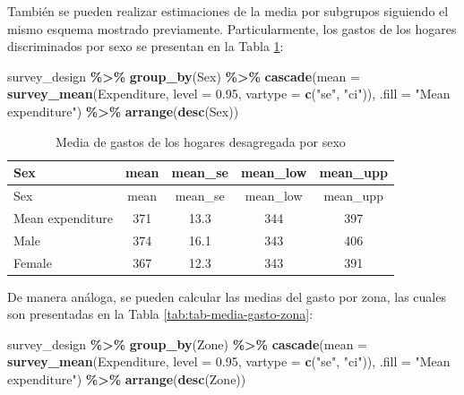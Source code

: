 \documentclass[
  spanish,
  12pt,
]{book}
\newenvironment{Shaded}{\begin{snugshade}}{\end{snugshade}}
\newcommand{\AttributeTok}[1]{\textcolor[rgb]{0.13,0.29,0.53}{#1}}
\newcommand{\FloatTok}[1]{\textcolor[rgb]{0.00,0.00,0.81}{#1}}
\newcommand{\FunctionTok}[1]{\textcolor[rgb]{0.13,0.29,0.53}{\textbf{#1}}}
\newcommand{\NormalTok}[1]{#1}
\newcommand{\SpecialCharTok}[1]{\textcolor[rgb]{0.81,0.36,0.00}{\textbf{#1}}}
\newcommand{\StringTok}[1]{\textcolor[rgb]{0.31,0.60,0.02}{#1}}
\begin{document}
También se pueden realizar estimaciones de la media por subgrupos siguiendo el mismo esquema mostrado previamente. Particularmente, los gastos de los hogares discriminados por sexo se presentan en la Tabla \ref{tab:tab-media-gasto-sexo}:

\begin{Shaded}
\begin{Highlighting}[]
\NormalTok{survey\_design }\SpecialCharTok{\%\textgreater{}\%}
  \FunctionTok{group\_by}\NormalTok{(Sex) }\SpecialCharTok{\%\textgreater{}\%}
  \FunctionTok{cascade}\NormalTok{(}\AttributeTok{mean =} \FunctionTok{survey\_mean}\NormalTok{(Expenditure,}
                              \AttributeTok{level =} \FloatTok{0.95}\NormalTok{,}
                              \AttributeTok{vartype =} \FunctionTok{c}\NormalTok{(}\StringTok{"se"}\NormalTok{, }\StringTok{"ci"}\NormalTok{)),}
        \AttributeTok{.fill =} \StringTok{"Mean expenditure"}\NormalTok{) }\SpecialCharTok{\%\textgreater{}\%}
  \FunctionTok{arrange}\NormalTok{(}\FunctionTok{desc}\NormalTok{(Sex))}
\end{Highlighting}
\end{Shaded}

\begin{longtable}[]{@{}lcccc@{}}
\caption{\label{tab:tab-media-gasto-sexo}Media de gastos de los hogares desagregada por sexo}\tabularnewline
\toprule\noalign{}
Sex & mean & mean\_se & mean\_low & mean\_upp \\
\midrule\noalign{}
\endfirsthead
\toprule\noalign{}
Sex & mean & mean\_se & mean\_low & mean\_upp \\
\midrule\noalign{}
\endhead
\bottomrule\noalign{}
\endlastfoot
Mean expenditure & 371 & 13.3 & 344 & 397 \\
Male & 374 & 16.1 & 343 & 406 \\
Female & 367 & 12.3 & 343 & 391 \\
\end{longtable}

De manera análoga, se pueden calcular las medias del gasto por zona, las cuales son presentadas en la Tabla \ref{tab:tab-media-gasto-zona}:

\begin{Shaded}
\begin{Highlighting}[]
\NormalTok{survey\_design }\SpecialCharTok{\%\textgreater{}\%}
  \FunctionTok{group\_by}\NormalTok{(Zone) }\SpecialCharTok{\%\textgreater{}\%}
  \FunctionTok{cascade}\NormalTok{(}\AttributeTok{mean =} \FunctionTok{survey\_mean}\NormalTok{(Expenditure,}
                              \AttributeTok{level =} \FloatTok{0.95}\NormalTok{,}
                              \AttributeTok{vartype =} \FunctionTok{c}\NormalTok{(}\StringTok{"se"}\NormalTok{, }\StringTok{"ci"}\NormalTok{)),}
        \AttributeTok{.fill =} \StringTok{"Mean expenditure"}\NormalTok{) }\SpecialCharTok{\%\textgreater{}\%}
  \FunctionTok{arrange}\NormalTok{(}\FunctionTok{desc}\NormalTok{(Zone))}
\end{Highlighting}
\end{Shaded}
\end{document}
